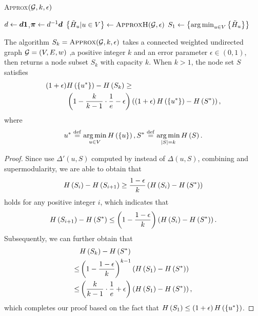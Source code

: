 \documentclass[sigconf]{acmart}
\begin{document}
\begin{algorithm}
    \caption{\textsc{Approx}\((\mathcal{G},k,\epsilon)\)}
    \label{algo:approx}
    \(d\gets\boldsymbol{d}\boldsymbol{1}\),\(\boldsymbol{\pi}\gets d^{-1}\boldsymbol{d}\)\;
    \(\left\{\tilde{H}_u|u\in V  \right\}\gets\textsc{ApproxH}(\mathcal{G},\epsilon)\)\;
    \(S_1\gets\left\{\operatorname*{arg\,min}_{u\in V}\left\{\tilde{H}_u \right\} \right\}\)\;
\end{algorithm}

\begin{theorem}
    The algorithm \(S_k=\textsc{Approx}(\mathcal{G},k,\epsilon)\) takes a connected weighted undirected graph \(\mathcal{G}=(V,E,w)\) ,a positive integer \(k\) and an error parameter \(\epsilon\in(0,1)\), then returns a node subset \(S_k\) with capacity \(k\). When \(k>1\), the node set \(S\) satisfies
    \begin{align*}
        \left( 1+\epsilon \right) & H\left(\left\{u^* \right\}\right)-H\left(S_k\right)\ge                                                                         \\
                           & \left( 1-\frac{k}{k-1}\cdot\frac{1}{e}-\epsilon \right)\left( \left( 1+\epsilon \right)H\left(\left\{u^* \right\}\right)-H\left(S^*\right) \right),
    \end{align*}
    where
    \[u^*\stackrel{\mathrm{def}}{=}\operatorname*{arg\,min}_{u\in V}H\left(\left\{u \right\}\right),S^*\stackrel{\mathrm{def}}{=}\operatorname*{arg\,min}_{\left|S \right|=k}H\left(S\right).\]
\end{theorem}
\begin{proof}
    Since  use \(\Delta'(u,S)\) computed by  instead of \(\Delta(u,S)\), combining  and supermodularity, we are able to obtain that
    \[H\left(S_i\right)-H\left(S_{i+1}\right)\ge\frac{1-\epsilon}{k}\left( H\left(S_i\right)-H\left(S^*\right) \right)\]
    holds for any positive integer \(i\), which indicates that
    \[H\left(S_{i+1}\right)-H\left(S^*\right)\le\left( 1-\frac{1-\epsilon}{k} \right)\left( H\left(S_i\right)-H\left(S^*\right) \right).\]
    Subsequently, we can further obtain that
    \begin{align*}
            & H\left(S_k\right)-H\left(S^*\right)                                                        \\
        \le & \left( 1-\frac{1-\epsilon}{k} \right)^{k-1}\left( H\left(S_1\right)-H\left(S^*\right) \right)            \\
        \le & \left( \frac{k}{k-1}\cdot\frac{1}{e}+\epsilon \right)\left( H\left(S_1\right)-H\left(S^*\right) \right),
    \end{align*}
    which completes our proof based on the fact that \(H\left(S_1\right)\le\left( 1+\epsilon \right)H\left(\left\{u^* \right\}\right)\).
\end{proof}
\end{document}
